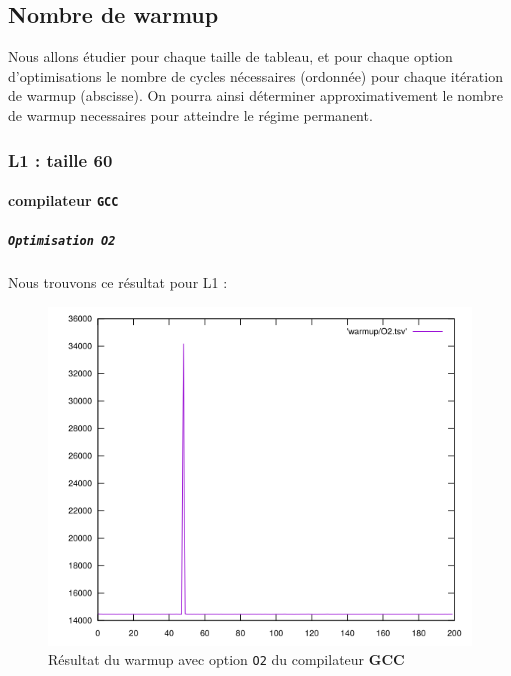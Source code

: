 \documentclass{report}
\begin{document}
    \subsection{Nombre de warmup}
    Nous allons étudier pour chaque taille de tableau, et pour chaque option d'optimisations le nombre de cycles nécessaires (ordonnée) pour chaque itération de warmup (abscisse). On pourra ainsi déterminer approximativement le nombre de warmup necessaires pour atteindre le régime permanent.
    \subsubsection{L1 : taille 60}
      \newpage
      \paragraph{compilateur \texttt{GCC}}
        \subparagraph{ \texttt{Optimisation O2}}
      Nous trouvons ce résultat pour L1 :
      \begin{figure}[ht!]
        \centering
        \includegraphics[scale=0.45]{resources/L1/warmup/O2.png}
        \caption{Résultat du warmup avec option \texttt{O2} du compilateur \textbf{GCC}}
      \end{figure}
      
\end{document}
